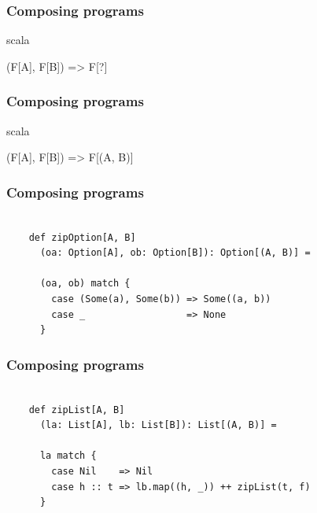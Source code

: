 \documentclass{beamer}
\begin{document}
\begin{frame}[fragile]

  \frametitle{Composing programs}

  \centering
  \Large

  \begin{cminted}{scala}

(F[A], F[B]) => F[?]

  \end{cminted}

\end{frame}

\begin{frame}[fragile]

  \frametitle{Composing programs}

  \centering
  \Large

  \begin{cminted}{scala}

(F[A], F[B]) => F[(A, B)]

  \end{cminted}

\end{frame}

\begin{frame}[fragile]

  \frametitle{Composing programs}

  \begin{verbatim}

    def zipOption[A, B]
      (oa: Option[A], ob: Option[B]): Option[(A, B)] =

      (oa, ob) match {
        case (Some(a), Some(b)) => Some((a, b))
        case _                  => None
      }

  \end{verbatim}

\end{frame}

\begin{frame}[fragile]

  \frametitle{Composing programs}

  \begin{verbatim}

    def zipList[A, B]
      (la: List[A], lb: List[B]): List[(A, B)] =

      la match {
        case Nil    => Nil
        case h :: t => lb.map((h, _)) ++ zipList(t, f)
      }

  \end{verbatim}

\end{frame}
\end{document}
